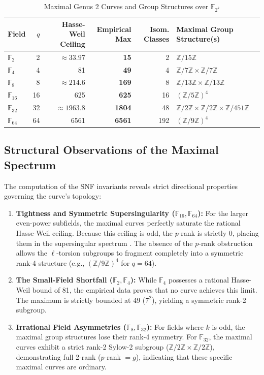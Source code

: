 \documentclass[11pt,letterpaper]{article}
\begin{document}
\begin{table}[h]
\centering
\caption{Maximal Genus 2 Curves and Group Structures over $\mathbb{F}_{2^k}$}
\label{tab:hasse_weil}
\begin{tabular}{lrrrrl}
\toprule
Field & $q$ & Hasse-Weil Ceiling & Empirical Max & Isom. Classes & Maximal Group Structure(s) \\
\midrule
$\mathbb{F}_2$ & 2 & $\approx 33.97$ & \textbf{15} & 2 & $\mathbb{Z}/15\mathbb{Z}$ \\
$\mathbb{F}_4$ & 4 & 81 & \textbf{49} & 4 & $\mathbb{Z}/7\mathbb{Z} \times \mathbb{Z}/7\mathbb{Z}$ \\
$\mathbb{F}_8$ & 8 & $\approx 214.6$ & \textbf{169} & 8 & $\mathbb{Z}/13\mathbb{Z} \times \mathbb{Z}/13\mathbb{Z}$ \\
$\mathbb{F}_{16}$ & 16 & 625 & \textbf{625} & 16 & $(\mathbb{Z}/5\mathbb{Z})^4$ \\
$\mathbb{F}_{32}$ & 32 & $\approx 1963.8$ & \textbf{1804} & 48 & $\mathbb{Z}/2\mathbb{Z} \times \mathbb{Z}/2\mathbb{Z} \times \mathbb{Z}/451\mathbb{Z}$ \\
$\mathbb{F}_{64}$ & 64 & 6561 & \textbf{6561} & 192 & $(\mathbb{Z}/9\mathbb{Z})^4$ \\
\bottomrule
\end{tabular}
\end{table}

\subsection{Structural Observations of the Maximal Spectrum}
The computation of the SNF invariants reveals strict directional properties governing the curve's topology:
\begin{enumerate}
\item \textbf{Tightness and Symmetric Supersingularity ($\mathbb{F}_{16}, \mathbb{F}_{64}$):} For the larger even-power subfields, the maximal curves perfectly saturate the rational Hasse-Weil ceiling. Because this ceiling is odd, the $p$-rank is strictly 0, placing them in the supersingular spectrum \cite{Scholten2002}. The absence of the $p$-rank obstruction allows the $\ell$-torsion subgroups to fragment completely into a symmetric rank-4 structure (e.g., $(\mathbb{Z}/9\mathbb{Z})^4$ for $q=64$).
\item \textbf{The Small-Field Shortfall ($\mathbb{F}_2, \mathbb{F}_4$):} While $\mathbb{F}_4$ possesses a rational Hasse-Weil bound of 81, the empirical data proves that no curve achieves this limit. The maximum is strictly bounded at 49 ($7^2$), yielding a symmetric rank-2 subgroup. 
\item \textbf{Irrational Field Asymmetries ($\mathbb{F}_8, \mathbb{F}_{32}$):} For fields where $k$ is odd, the maximal group structures lose their rank-4 symmetry. For $\mathbb{F}_{32}$, the maximal curves exhibit a strict rank-2 Sylow-2 subgroup ($\mathbb{Z}/2\mathbb{Z} \times \mathbb{Z}/2\mathbb{Z}$), demonstrating full 2-rank ($p$-rank $= g$), indicating that these specific maximal curves are ordinary.
\end{enumerate}
\end{document}
